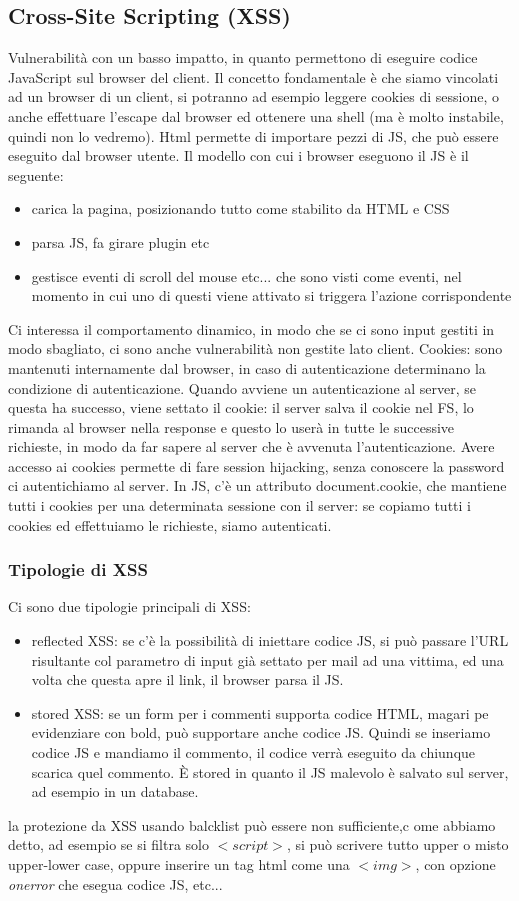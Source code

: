 \documentclass{article}
\begin{document}
\subsection{Cross-Site Scripting (XSS)}
Vulnerabilità con un basso impatto, in quanto permettono di eseguire codice JavaScript sul browser del client. Il concetto fondamentale è che siamo vincolati ad un browser di un client, si potranno ad esempio leggere cookies di sessione, o anche effettuare l'escape dal browser ed ottenere una shell (ma è molto instabile, quindi non lo vedremo). Html permette di importare pezzi di JS, che può essere eseguito dal browser utente. Il modello con cui i browser eseguono il JS è il seguente:
\begin{itemize}
\item carica la pagina, posizionando tutto come stabilito da HTML e CSS
\item parsa JS, fa girare plugin etc
\item gestisce eventi di scroll del mouse etc... che sono visti come eventi, nel momento in cui uno di questi viene attivato si triggera l'azione corrispondente
\end{itemize}
Ci interessa il comportamento dinamico, in modo che se ci sono input gestiti in modo sbagliato, ci sono anche vulnerabilità non gestite lato client. Cookies: sono mantenuti internamente dal browser, in caso di autenticazione determinano la condizione di autenticazione. Quando avviene un autenticazione al server, se questa ha successo, viene settato il cookie: il server salva il cookie nel FS, lo rimanda al browser nella response e questo lo userà in tutte le successive richieste, in modo da far sapere al server che è avvenuta l'autenticazione. Avere accesso ai cookies permette di fare session hijacking, senza conoscere la password ci autentichiamo al server. In JS, c'è un attributo document.cookie, che mantiene tutti i cookies per una determinata sessione con il server: se copiamo tutti i cookies ed effettuiamo le richieste, siamo autenticati.
\subsubsection{Tipologie di XSS}
Ci sono due tipologie principali di XSS:
\begin{itemize}
\item reflected XSS: se c'è la possibilità di iniettare codice JS, si può passare l'URL risultante col parametro di input già settato per mail ad una vittima, ed una volta che questa apre il link, il browser parsa il JS.
\item stored XSS: se un form per i commenti supporta codice HTML, magari pe evidenziare con bold, può supportare anche codice JS. Quindi se inseriamo codice JS e mandiamo il commento, il codice verrà eseguito da chiunque scarica quel commento. È stored in quanto il JS malevolo è salvato sul server, ad esempio in un database.
\end{itemize}
la protezione da XSS usando balcklist può essere non sufficiente,c ome abbiamo detto, ad esempio se si filtra solo $<script>$, si può scrivere tutto upper o misto upper-lower case, oppure inserire un tag html come una $<img>$, con opzione \textit{onerror} che esegua codice JS, etc...
\end{document}
